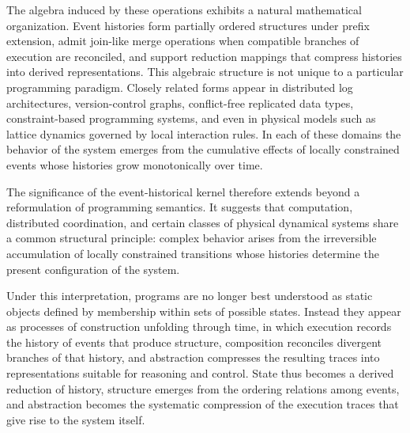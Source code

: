 \documentclass[12pt]{article}
\begin{document}
The algebra induced by these operations exhibits a natural
mathematical organization. Event histories form partially
ordered structures under prefix extension, admit join-like
merge operations when compatible branches of execution are
reconciled, and support reduction mappings that compress
histories into derived representations. This algebraic
structure is not unique to a particular programming paradigm.
Closely related forms appear in distributed log architectures,
version-control graphs, conflict-free replicated data types,
constraint-based programming systems, and even in physical
models such as lattice dynamics governed by local interaction
rules. In each of these domains the behavior of the system
emerges from the cumulative effects of locally constrained
events whose histories grow monotonically over time.

The significance of the event-historical kernel therefore
extends beyond a reformulation of programming semantics.
It suggests that computation, distributed coordination,
and certain classes of physical dynamical systems share a
common structural principle: complex behavior arises from
the irreversible accumulation of locally constrained
transitions whose histories determine the present
configuration of the system.

Under this interpretation, programs are no longer best
understood as static objects defined by membership within
sets of possible states. Instead they appear as processes
of construction unfolding through time, in which execution
records the history of events that produce structure,
composition reconciles divergent branches of that history,
and abstraction compresses the resulting traces into
representations suitable for reasoning and control.
State thus becomes a derived reduction of history,
structure emerges from the ordering relations among events,
and abstraction becomes the systematic compression of the
execution traces that give rise to the system itself.

\newpage
\end{document}
